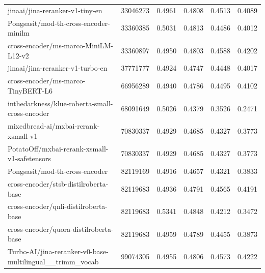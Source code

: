 {\begin{xltabular}{\textwidth}{X rrrrr}
      jinaai/jina-reranker-v1-tiny-en                                        & 33046273      & 0.4961        & 0.4808        & 0.4513        & 0.4089         \\
      Pongsasit/mod-th-cross-encoder-minilm                                  & 33360385      & 0.5031        & 0.4813        & 0.4486        & 0.4012         \\
      cross-encoder/ms-marco-MiniLM-L12-v2                                   & 33360897      & 0.4950        & 0.4803        & 0.4588        & 0.4202         \\
      jinaai/jina-reranker-v1-turbo-en                                       & 37771777      & 0.4924        & 0.4747        & 0.4448        & 0.4017         \\
      cross-encoder/ms-marco-TinyBERT-L6                                     & 66956289      & 0.4940        & 0.4786        & 0.4495        & 0.4102         \\
      inthedarkness/klue-roberta-small-cross-encoder                         & 68091649      & 0.5026        & 0.4379        & 0.3526        & 0.2471         \\
      mixedbread-ai/mxbai-rerank-xsmall-v1                                   & 70830337      & 0.4929        & 0.4685        & 0.4327        & 0.3773         \\
      PotatoOff/mxbai-rerank-xsmall-v1-safetensors                           & 70830337      & 0.4929        & 0.4685        & 0.4327        & 0.3773         \\
      Pongsasit/mod-th-cross-encoder                                         & 82119169      & 0.4916        & 0.4657        & 0.4321        & 0.3833         \\
      cross-encoder/stsb-distilroberta-base                                  & 82119683      & 0.4936        & 0.4791        & 0.4565        & 0.4191         \\
      cross-encoder/qnli-distilroberta-base                                  & 82119683      & 0.5341        & 0.4848        & 0.4212        & 0.3472         \\
      cross-encoder/quora-distilroberta-base                                 & 82119683      & 0.4959        & 0.4789        & 0.4455        & 0.3873         \\
      Turbo-AI/jina-reranker-v0-base-multilingual\_\_trimm\_vocab            & 99074305      & 0.4955        & 0.4806        & 0.4573        & 0.4222         \\

\end{xltabular}}
